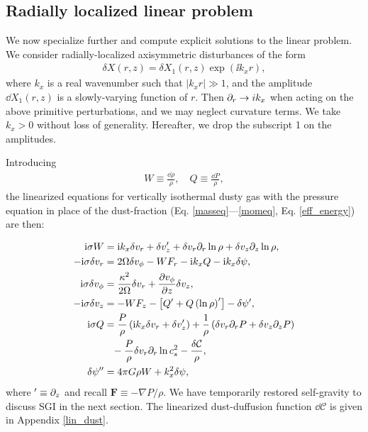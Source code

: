 
\subsection{Radially localized linear problem}
We now specialize further and compute explicit solutions to the linear
problem. We consider radially-localized axisymmetric disturbances of the form  
\begin{align}
  \delta X (r, z) = \delta X_1(r,z)\exp{(\ii k_x r)},
\end{align} 
where $k_x$ is a real wavenumber such that $|k_xr|\gg 1$, and the 
amplitude $\dd X_1(r,z)$ is 
a slowly-varying function of $r$. Then 
$\partial_r\to i k_x$ when acting on the above primitive perturbations, and we may
neglect curvature terms. We take  
$k_x>0$ without loss of generality. Hereafter, we drop the subscript 1
on the amplitudes. 

Introducing 
\begin{align}
  W \equiv \frac{\dd\rho}{\rho}, \quad Q \equiv \frac{\dd P}{\rho},
\end{align}
the linearized equations for 
vertically isothermal dusty gas with the pressure
equation in place of the dust-fraction
(Eq. \ref{masseq}---\ref{momeq}, Eq. \ref{eff_energy}) are then:    

\begin{align}
  \ii\sigma W &= \ii k_x \dd v_r + \dd v_z^\prime +
  \dd v_r \p_r\ln{\rho} + \dd v_z\p_z\ln{\rho},\label{lin_mass}\\
  -\ii\sigma\dd v_r  &= 2\Omega\dd v_\phi 
- W F_r - \ii k_x Q - \ii k_x\dd\psi,\label{lin_xmom}\\
  \ii\sigma\dd v_\phi &= \frac{\kappa^2}{2\Omega}\dd v_r + \frac{\p
    v_\phi}{\p z}\dd v_z, \label{lin_ymom}\\
  -\ii\sigma\dd v_z &= - W F_z - \left[Q^\prime + Q
    \left(\ln{\rho}\right)^\prime\right] - \dd\psi^\prime  %
,\label{lin_zmom}\\
  \ii\sigma Q &= \frac{P}{\rho}\left(\ii k_x \dd v_r + \dd
               v_z^\prime\right) + \frac{1}{\rho}\left(\dd v_r\p_rP + \dd v_z \p_zP\right)\notag\\
                &\phantom{=}-\frac{P}{\rho} \dd v_r\p_r
               \ln{c_s^2} %
               - \frac{\dd\mathcal{C}}{\rho},\label{lin_energy}\\
\dd\psi^{\prime\prime}  &= 4\pi G \rho W + k_x^2\dd\psi, \label{lin_sg}
\end{align}  
where $^\prime \equiv \partial_z$ and recall $\bm{F} \equiv -\nabla
P/\rho$. We have temporarily restored self-gravity  to
discuss SGI in the next
section. The linearized dust-duffusion function 
$\dd\mathcal{C}$ is given in  Appendix \ref{lin_dust}. 


